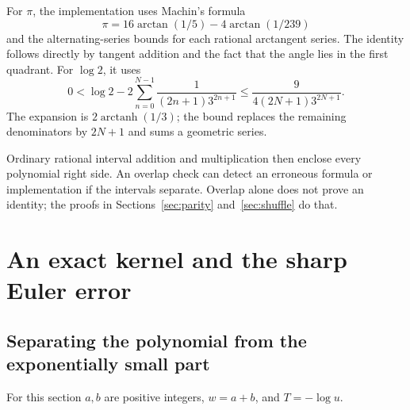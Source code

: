 \documentclass[11pt,a4paper]{article}
\numberwithin{equation}{section}
\theoremstyle{definition}
\theoremstyle{remark}
\begin{document}
For $\pi$, the implementation uses Machin's formula
\[
 \pi=16\arctan(1/5)-4\arctan(1/239)
\]
and the alternating-series bounds for each rational arctangent series. The identity follows directly by tangent addition and the fact that the angle lies in the first quadrant. For $\log2$, it uses
\begin{equation}\label{eq:log2-bound}
 0<\log2-2\sum_{n=0}^{N-1}\frac1{(2n+1)3^{2n+1}}
 \le\frac9{4(2N+1)3^{2N+1}}.
\end{equation}
The expansion is $2\operatorname{arctanh}(1/3)$; the bound replaces the remaining denominators by $2N+1$ and sums a geometric series.

Ordinary rational interval addition and multiplication then enclose every polynomial right side. An overlap check can detect an erroneous formula or implementation if the intervals separate. Overlap alone does not prove an identity; the proofs in Sections~\ref{sec:parity} and~\ref{sec:shuffle} do that.

\section{An exact kernel and the sharp Euler error}
\label{sec:sharp-error}

\subsection{Separating the polynomial from the exponentially small part}
For this section $a,b$ are positive integers, $w=a+b$, and $T=-\log u$.
\end{document}
